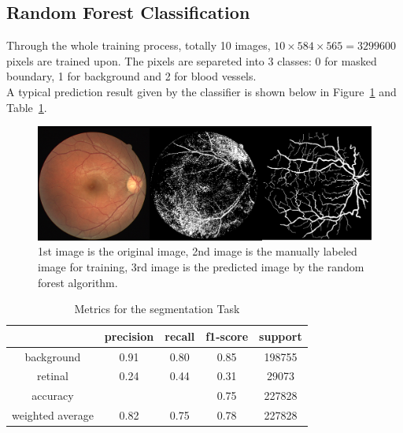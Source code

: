 \documentclass[final]{article}
\begin{document}
\subsection{Random Forest Classification}
Through the whole training process, totally 10 images, \(10 \times 584 \times 565 = 3299600\) pixels are trained upon. The pixels are separeted into 3 classes: 0 for masked boundary, 1 for background and 2 for blood vessels. \\
A typical prediction result given by the classifier is shown below in Figure~\ref{fig:mjct27} and Table~\ref{tab:mjct27}. 
\begin{figure}[H]
    \centering
        \centering
        \includegraphics[scale=0.2]{Figures/mjc.png}
        \caption{1st image is the original image, 2nd image is the manually labeled image for training, 3rd image is the predicted image by the random forest algorithm.}\label{fig:mjct27}
\end{figure}
\vspace{-0.75cm}
\begin{table}[H]
    \centering
    \caption{Metrics for the segmentation Task}
    \begin{tabular}{ccccc}
    \toprule
                     & precision & recall & f1-score & support \\
    \midrule
    background       & 0.91      & 0.80   & 0.85     & 198755  \\
    retinal          & 0.24      & 0.44   & 0.31     & 29073   \\
    accuracy         &           &        & 0.75     & 227828  \\
    weighted average & 0.82      & 0.75   & 0.78     & 227828  \\
    \bottomrule
    \end{tabular}
    \label{tab:mjct27}
\end{table}
\end{document}
